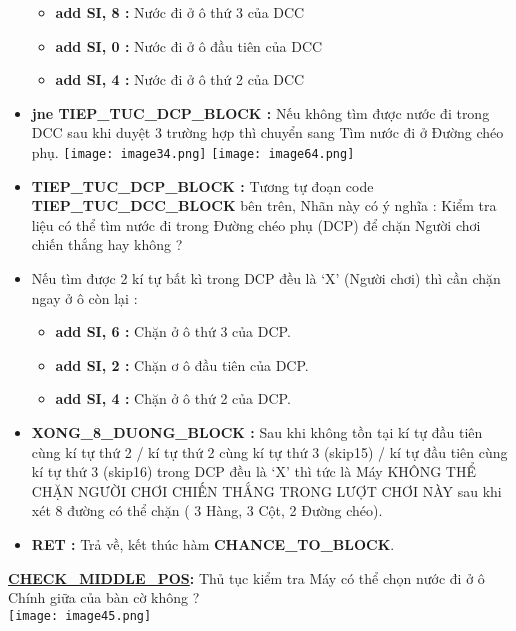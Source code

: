 \begin{itemize}
\begin{itemize}
        \item \textbf{add SI, 8 :} Nước đi ở ô thứ 3 của DCC
        \item \textbf{add SI, 0 : }Nước đi ở ô đầu tiên của DCC
        \item \textbf{add SI, 4 :} Nước đi ở ô thứ 2 của DCC
    \end{itemize}
    \item \textbf{jne TIEP\_TUC\_DCP\_BLOCK :} Nếu không tìm được nước đi trong DCC sau khi duyệt 3 trường hợp thì chuyển sang Tìm nước đi ở Đường chéo phụ.
    \texttt{[image: image34.png]}
    \texttt{[image: image64.png]}
    \item \textbf{TIEP\_TUC\_DCP\_BLOCK :} Tương tự đoạn code \textbf{TIEP\_TUC\_DCC\_BLOCK} bên trên, Nhãn này có ý nghĩa : Kiểm tra liệu có thể tìm nước đi trong Đường chéo phụ (DCP) để chặn Người chơi chiến thắng hay không ?
    \item Nếu tìm được 2 kí tự bất kì trong DCP đều là ‘X’ (Người chơi) thì cần chặn ngay ở ô còn lại : 
    \begin{itemize}
        \item \textbf{add SI, 6 :} Chặn ở ô thứ 3 của DCP.
        \item \textbf{add SI, 2 :} Chặn ơ ô đầu tiên của DCP.
        \item \textbf{add SI, 4 :} Chặn ở ô thứ 2 của DCP.
    \end{itemize}
    \item \textbf{XONG\_8\_DUONG\_BLOCK :} Sau khi không tồn tại kí tự đầu tiên cùng kí tự thứ 2 / kí tự thứ 2 cùng kí tự thứ 3 (skip15) / kí tự đầu tiên cùng kí tự thứ 3 (skip16) trong DCP đều là ‘X’ thì tức là Máy KHÔNG THỂ CHẶN NGƯỜI CHƠI CHIẾN THẮNG TRONG LƯỢT CHƠI NÀY sau khi xét 8 đường có thể chặn ( 3 Hàng, 3 Cột, 2 Đường chéo).
    \item \textbf{RET :} Trả về, kết thúc hàm \textbf{CHANCE\_TO\_BLOCK}.
\end{itemize}


\textbf{\underline{CHECK\_MIDDLE\_POS}: }Thủ tục kiểm tra Máy có thể chọn nước đi ở ô Chính giữa của bàn cờ không ?\\
\texttt{[image: image45.png]}

